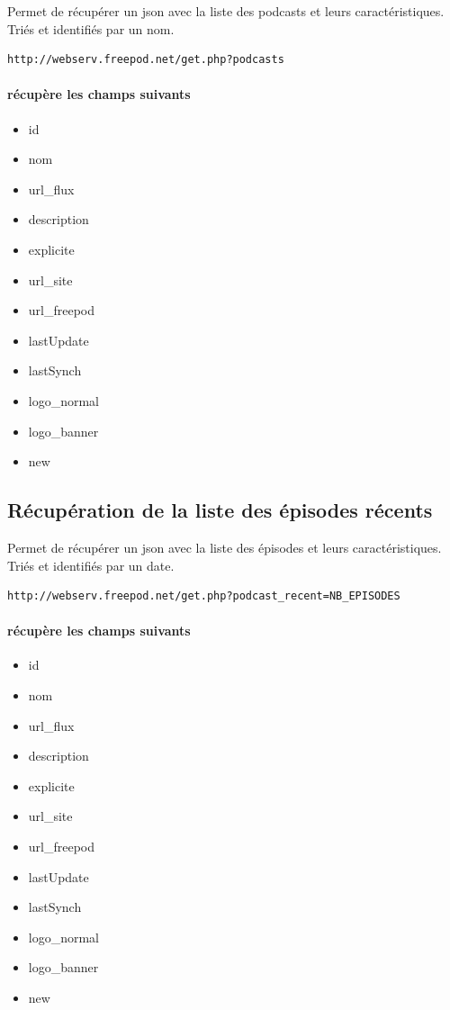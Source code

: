 \documentclass[11pt, french]{report}
\begin{document}
Permet de récupérer un json avec la liste des podcasts et leurs caractéristiques. Triés et identifiés par un nom.

\begin{lstlisting}
http://webserv.freepod.net/get.php?podcasts
\end{lstlisting}

\paragraph{récupère les champs suivants}
\begin{itemize}
\item id
\item nom
\item url\_flux
\item description
\item explicite
\item url\_site
\item url\_freepod
\item lastUpdate
\item lastSynch
\item logo\_normal
\item logo\_banner
\item new
\end{itemize}

\subsection*{Récupération de la liste des épisodes récents}

Permet de récupérer un json avec la liste des épisodes et leurs caractéristiques. Triés et identifiés par un date.

\begin{lstlisting}
http://webserv.freepod.net/get.php?podcast_recent=NB_EPISODES
\end{lstlisting}

\paragraph{récupère les champs suivants}
\begin{itemize}
\item id
\item nom
\item url\_flux
\item description
\item explicite
\item url\_site
\item url\_freepod
\item lastUpdate
\item lastSynch
\item logo\_normal
\item logo\_banner
\item new
\end{itemize}
\end{document}
